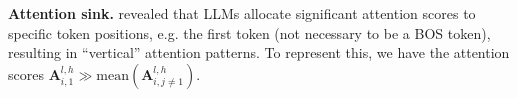 


\textbf{Attention sink.} \citet{xiao2023efficient} revealed that LLMs allocate significant attention scores to specific token positions, e.g. the first token (not necessary to be a BOS token), resulting in ``vertical'' attention patterns. To represent this, we have the attention scores $\boldsymbol{A}_{i\textrm{,}\,1}^{l\textrm{,}\,h}\gg \textrm{mean}(\boldsymbol{A}_{i\textrm{,}\,j\neq 1}^{l\textrm{,}\,h})$.








